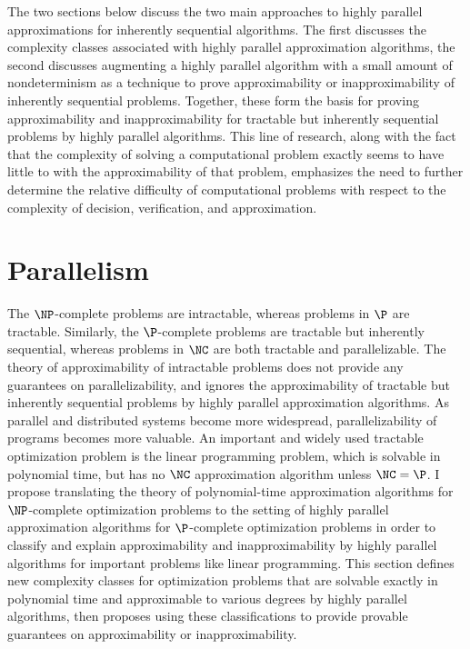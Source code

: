 \documentclass{article}
\begin{document}
%
The two sections below discuss the two main approaches to highly parallel approximations for inherently sequential algorithms.
The first discusses the complexity classes associated with highly parallel approximation algorithms, the second discusses augmenting a highly parallel algorithm with a small amount of nondeterminism as a technique to prove approximability or inapproximability of inherently sequential problems.
Together, these form the basis for proving approximability and inapproximability for tractable but inherently sequential problems by highly parallel algorithms.
This line of research, along with the fact that the complexity of solving a computational problem exactly seems to have little to with the approximability of that problem, emphasizes the need to further determine the relative difficulty of computational problems with respect to the complexity of decision, verification, and approximation.

\section{Parallelism}
%
%
%
The $\NP$-complete problems are intractable, whereas problems in $\P$ are tractable.
Similarly, the $\P$-complete problems are tractable but inherently sequential, whereas problems in $\NC$ are both tractable and parallelizable.
%
%
The theory of approximability of intractable problems does not provide any guarantees on parallelizability, and ignores the approximability of tractable but inherently sequential problems by highly parallel approximation algorithms.
As parallel and distributed systems become more widespread, parallelizability of programs becomes more valuable.
An important and widely used tractable optimization problem is the linear programming problem, which is solvable in polynomial time, but has no $\NC$ approximation algorithm unless $\NC = \P$.
%
%
I propose translating the theory of polynomial-time approximation algorithms for $\NP$-complete optimization problems to the setting of highly parallel approximation algorithms for $\P$-complete optimization problems in order to classify and explain approximability and inapproximability by highly parallel algorithms for important problems like linear programming.
%
%
This section defines new complexity classes for optimization problems that are solvable exactly in polynomial time and approximable to various degrees by highly parallel algorithms, then proposes using these classifications to provide provable guarantees on approximability or inapproximability.
\end{document}
